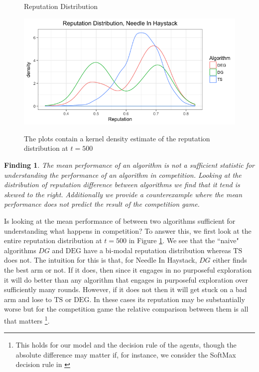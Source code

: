 \documentclass[letterpaper]{article}
\theoremstyle{definition}
\newtheorem{finding}{Finding}
\newcommand{\TS}{\mathrm{TS}}
\newcommand{\DEG}{\mathrm{DEG}}
\begin{document}
\begin{figure}[H]
\caption{Reputation Distribution}
\includegraphics[scale=0.35]{figures/rep_distribution_nih}
\label{rep_dist_nih}
\caption*{\tiny{The plots contain a kernel density estimate of the reputation distribution at $t = 500$}}
\end{figure}

\begin{finding}
\textit{The mean performance of an algorithm is not a sufficient statistic for understanding the performance of an algorithm in competition. Looking at the distribution of reputation difference between algorithms we find that it tend is skewed to the right. Additionally we provide a counterexample where the mean performance does not predict the result of the competition game.}
\end{finding}


Is looking at the mean performance of between two algorithms sufficient for understanding what happens in competition? To answer this, we first look at the entire reputation distribution at $t = 500$ in Figure \ref{rep_dist_nih}. We see that the ``naive" algorithms $DG$ and $\DEG$ have a bi-modal reputation distribution whereas $\TS$ does not. The intuition for this is that, for Needle In Haystack, $DG$ either finds the best arm or not. If it does, then since it engages in no purposeful exploration it will do better than any algorithm that engages in purposeful exploration over sufficiently many rounds. However, if it does not then it will get stuck on a bad arm and lose to $\TS$ or $\DEG$. In these cases its reputation may be substantially worse but for the competition game the relative comparison between them is all that matters \footnote{This holds for our model and the decision rule of the agents, though the absolute difference may matter if, for instance, we consider the SoftMax decision rule in \cite{mansour2018competing}}.
\end{document}

